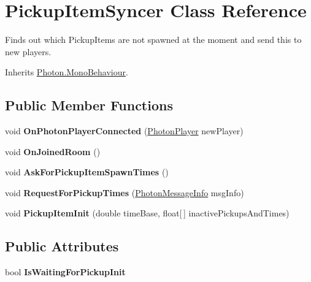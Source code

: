 \hypertarget{class_pickup_item_syncer}{}\section{Pickup\+Item\+Syncer Class Reference}
\label{class_pickup_item_syncer}


Finds out which Pickup\+Items are not spawned at the moment and send this to new players.  




Inherits \hyperlink{class_photon_1_1_mono_behaviour}{Photon.\+Mono\+Behaviour}.

\subsection*{Public Member Functions}
\begin{DoxyCompactItemize}
\item 
void {\bfseries On\+Photon\+Player\+Connected} (\hyperlink{class_photon_player}{Photon\+Player} new\+Player)\hypertarget{class_pickup_item_syncer_a03bd1854f3cd463eeb6069d8361f9291}{}\label{class_pickup_item_syncer_a03bd1854f3cd463eeb6069d8361f9291}

\item 
void {\bfseries On\+Joined\+Room} ()\hypertarget{class_pickup_item_syncer_a3d32b13c4ab1ce5ae07bcd53cba4e27e}{}\label{class_pickup_item_syncer_a3d32b13c4ab1ce5ae07bcd53cba4e27e}

\item 
void {\bfseries Ask\+For\+Pickup\+Item\+Spawn\+Times} ()\hypertarget{class_pickup_item_syncer_aa547e02e224afe732975461f6e9b199e}{}\label{class_pickup_item_syncer_aa547e02e224afe732975461f6e9b199e}

\item 
void {\bfseries Request\+For\+Pickup\+Times} (\hyperlink{class_photon_message_info}{Photon\+Message\+Info} msg\+Info)\hypertarget{class_pickup_item_syncer_a8e9a45de2ffa43ff060ac3f7090e9c89}{}\label{class_pickup_item_syncer_a8e9a45de2ffa43ff060ac3f7090e9c89}

\item 
void {\bfseries Pickup\+Item\+Init} (double time\+Base, float\mbox{[}$\,$\mbox{]} inactive\+Pickups\+And\+Times)\hypertarget{class_pickup_item_syncer_a4de4ad14f8762a6f4a18206cb043376f}{}\label{class_pickup_item_syncer_a4de4ad14f8762a6f4a18206cb043376f}

\end{DoxyCompactItemize}
\subsection*{Public Attributes}
\begin{DoxyCompactItemize}
\item 
bool {\bfseries Is\+Waiting\+For\+Pickup\+Init}\hypertarget{class_pickup_item_syncer_a825d5218c87edf22d2bd28c104017303}{}\label{class_pickup_item_syncer_a825d5218c87edf22d2bd28c104017303}

\end{DoxyCompactItemize}
